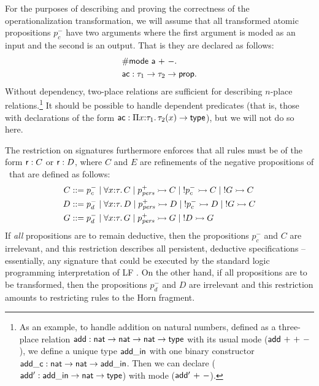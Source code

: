 For the purposes of describing and proving the correctness of the
operationalization transformation, we will assume that all transformed
atomic propositions $p_c^-$ have two arguments where the first
argument is moded as an input and the second is an output. That is
they are declared as follows:
\begin{align*}
& {\sf \#mode~a~{+}~{-}}.\\
& {\sf ac} : \tau_1 \rightarrow \tau_2 \rightarrow {\sf prop}.
\end{align*}
Without dependency, two-place relations are sufficient for describing
$n$-place relations.\footnote{As an example, to handle addition on
  natural numbers, defined as a three-place relation ${\sf add} : {\sf
    nat} \rightarrow {\sf nat} \rightarrow {\sf nat} \rightarrow {\sf
    type}$ with its usual mode (${\sf add}~{+}~{+}~{-}$), we define a
  unique type ${\sf add\_in}$ with one binary constructor ${\sf
    add\_c} : {\sf nat} \rightarrow {\sf nat} \rightarrow {\sf
    add\_in}$. Then we can declare (${\sf add'} : {\sf add\_in}
  \rightarrow {\sf nat} \rightarrow {\sf type}$) with mode (${\sf
    add'}~{+}~{-}$).}  It should be possible to handle dependent
predicates (that is, those with declarations of the form ${\sf ac} :
\Pi x{:}\tau_1.\,\tau_2(x) \rightarrow {\sf type}$), but we will not do
so here.

The restriction on signatures furthermore enforces that all rules must
be of the form ${\sf r} : C$ or ${\sf r} : D$, where $C$ and $E$ are
refinements of the negative propositions of \sls~that are defined as
follows:
\begin{align*}
C & ::= p^-_{c} 
    \mid \forall x{:}\tau.\, C
    \mid p^+_{\it pers} \rightarrowtail C
    \mid {!}p^-_c \rightarrowtail C
    \mid {!}G \rightarrowtail C \\
D & ::= p^-_{d}
    \mid \forall x{:}\tau.\, D
    \mid p^+_{\it pers} \rightarrowtail D
    \mid {!}p^-_c \rightarrowtail D
    \mid {!}G \rightarrowtail C \\
G & ::= p^-_d 
    \mid \forall x{:}\tau.\, G
    \mid p^+_{\it pers} \rightarrowtail G
    \mid {!}D \rightarrowtail G
\end{align*}
If {\it all} propositions are to remain deductive, then the
propositions $p^-_c$ and $C$ are irrelevant, and this restriction
describes all persistent, deductive specifications -- essentially, any
signature that could be executed by the standard logic programming
interpretation of LF \cite{pfenning89elf}. On the other hand, if all
propositions are to be transformed, then the propositions $p^-_d$ and
$D$ are irrelevant and this restriction amounts to restricting
rules to the Horn fragment.

